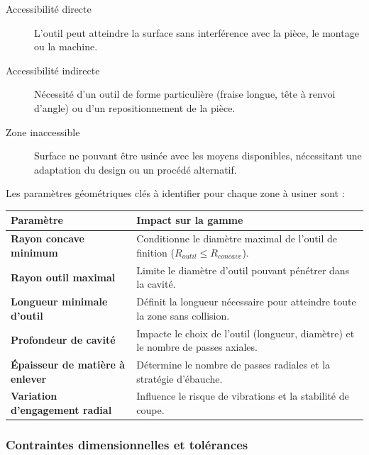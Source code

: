 \documentclass{article}
\begin{document}
\begin{tcolorbox}[colback=blue!5!white, colframe=blue!75!black, title=Contraintes d'accessibilité - Définitions]
\begin{description}
    \item[Accessibilité directe] L'outil peut atteindre la surface sans interférence avec la pièce, le montage ou la machine.
    \item[Accessibilité indirecte] Nécessité d'un outil de forme particulière (fraise longue, tête à renvoi d'angle) ou d'un repositionnement de la pièce.
    \item[Zone inaccessible] Surface ne pouvant être usinée avec les moyens disponibles, nécessitant une adaptation du design ou un procédé alternatif.
\end{description}
\end{tcolorbox}

Les paramètres géométriques clés à identifier pour chaque zone à usiner sont :

\begin{tabular}{|p{}|p{}|}
\hline
\textbf{Paramètre} & \textbf{Impact sur la gamme} \\
\hline
\textbf{Rayon concave minimum} & Conditionne le diamètre maximal de l'outil de finition ($R_{outil} \leq R_{concave}$). \\
\hline
\textbf{Rayon outil maximal} & Limite le diamètre d'outil pouvant pénétrer dans la cavité. \\
\hline
\textbf{Longueur minimale d'outil} & Définit la longueur nécessaire pour atteindre toute la zone sans collision. \\
\hline
\textbf{Profondeur de cavité} & Impacte le choix de l'outil (longueur, diamètre) et le nombre de passes axiales. \\
\hline
\textbf{Épaisseur de matière à enlever} & Détermine le nombre de passes radiales et la stratégie d'ébauche. \\
\hline
\textbf{Variation d'engagement radial} & Influence le risque de vibrations et la stabilité de coupe. \\
\hline
\end{tabular}

\subsubsection{Contraintes dimensionnelles et tolérances}
\end{document}
